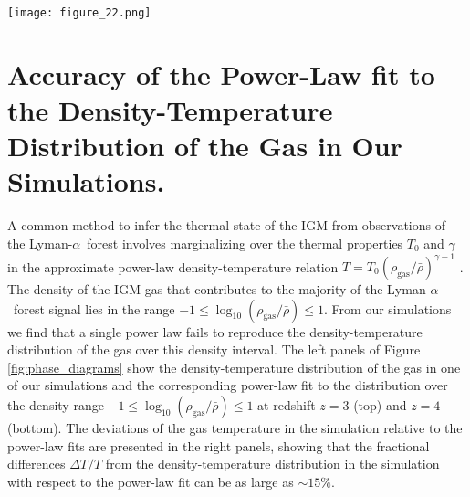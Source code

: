 \documentclass[twocolumn]{aastex62}
\newcommand\Lya{Lyman-$\alpha$}
\begin{document}
\begin{figure*}
\texttt{[image: figure\_22.png]}
\caption{Density-temperature distribution of the IGM gas (left column) from one of our simulations at
redshift $z=3$ (top) and $z=4$ (bottom). 
A power law fit of the form $T=T_0 \left( \rho_\mathrm{gas} / \bar{\rho} \right)^{\gamma-1}$ over the range $-1 \leq  \log_{10}(\rho_\mathrm{gas} / \bar{\rho} ) \leq 1$ 
is shown (black dashed lines). The right columns shows 
deviations of the density-temperature distribution
with respect to the power-law fit over the fitted range. 
The blue region corresponds to the 68\% highest probability interval for the temperature as function of the overdensity $\rho_\mathrm{gas} / \bar{\rho}$. 
The differences between the distribution of the gas
relative to
the power-law fit can be as large as $\sim 15\%$.}
\label{fig:phase_diagrams}
\end{figure*}



\section{ Accuracy of the Power-Law fit to the Density-Temperature Distribution of the Gas in Our Simulations. }
\label{sec:phase_diagram}


A common method 
to infer the thermal state of the IGM from observations of the \Lya\ forest
involves marginalizing over the thermal properties $T_0$
and $\gamma$ in the 
approximate power-law density-temperature relation $T=T_0 \left( \rho_\mathrm{gas} / \bar{\rho} \right)^{\gamma-1}$ \citep{ bolton2014a, Nasir+2016, hiss2018a,  boera2019a,   walther2019a, gaikwad2020b}.
The density of the 
IGM gas that contributes to the majority of the \Lya\ forest signal lies
in the range  $-1 \leq  \log_{10}(\rho_\mathrm{gas} / \bar{\rho} ) \leq 1$. From our simulations
we find that a single power law fails to reproduce the density-temperature distribution of the gas over this density interval. The left panels of 
Figure \ref{fig:phase_diagrams} show 
the density-temperature distribution of the gas in one of our simulations and the corresponding power-law fit to the distribution over the density 
range $-1 \leq  \log_{10}(\rho_\mathrm{gas} / \bar{\rho} ) \leq 1$ at redshift $z=3$ (top) and $z=4$ (bottom). The deviations of the gas 
temperature in the simulation relative to
the power-law fits are
presented in the right panels, showing that the 
fractional differences $\Delta T /T$ from the density-temperature distribution in the simulation with 
respect to the power-law fit can be as large as $\sim 15\%$.




\end{document}
